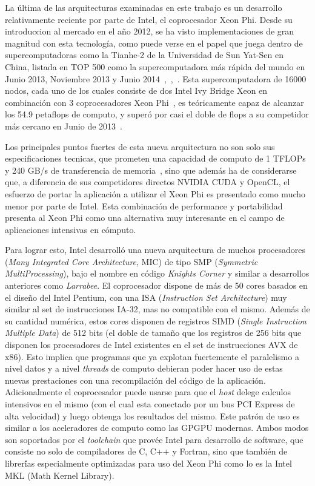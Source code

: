 La \'ultima de las arquitecturas examinadas en este trabajo es un desarrollo relativamente reciente
por parte de Intel, el coprocesador Xeon Phi. Desde su introduccion al mercado en el a\~no 2012, se ha visto implementaciones de gran magnitud con esta tecnolog\'ia, como puede verse en el papel que juega dentro de supercomputadoras como la Tianhe-2 de la Universidad de Sun Yat-Sen en China,
listada en TOP 500 como la supercomputadora más rápida del mundo en Junio 2013, Noviembre 2013 y
Junio 2014~\cite{Top500XeonPhiJune2013},~\cite{Top500XeonPhiNov2013},~\cite{Top500XeonPhiJune2014}. Esta supercomputadora de 16000 nodos, cada uno de los cuales consiste de dos Intel
Ivy Bridge Xeon en combinaci\'on con 3 coprocesadores Xeon Phi~\cite{Top500XeonPhiJune2013}, es te\'oricamente capaz de alcanzar los
54.9 petaflops de computo, y super\'o por casi el doble de flops a su competidor m\'as cercano en
Junio de 2013~\cite{Top500XeonPhiJune2013}.

Los principales puntos fuertes de esta nueva arquitectura no son solo sus especificaciones tecnicas, que prometen una
capacidad de computo de 1 TFLOPs y 240 GB/s de transferencia de memoria~\cite{}, sino que además ha de considerarse
que, a diferencia de sus competidores directos NVIDIA CUDA y OpenCL, el esfuerzo de portar la aplicación a utilizar
el Xeon Phi es presentado como mucho menor por parte de Intel. Esta combinación de performance y portabilidad
presenta al Xeon Phi como una alternativa muy interesante en el campo de aplicaciones intensivas en cómputo.

Para lograr esto, Intel desarroll\'o una nueva arquitectura de muchos procesadores (\textit{Many Integrated Core Architecture}, MIC) de
tipo SMP (\textit{Symmetric MultiProcessing}), bajo el nombre en código \textit{Knights Corner} y similar a desarrollos anteriores como \textit{Larrabee}. El coprocesador dispone de más de 50 cores basados en el dise\~no del Intel Pentium, con una ISA (\textit{Instruction Set Architecture}) muy similar al set de instrucciones IA-32, mas no compatible con el mismo. Además de su cantidad
numérica, estos cores disponen de registros SIMD (\textit{Single Instruction Multiple Data}) de 512 bits (el doble de tamaño que los registros de 256
bits que disponen los procesadores de Intel existentes en el set de instrucciones AVX de x86). Esto implica que programas
que ya explotan fuertemente el paralelismo a nivel datos y a nivel \textit{threads} de computo debieran poder hacer uso de
estas nuevas prestaciones con una recompilación del c\'odigo de la aplicaci\'on. Adicionalmente el coprocesador puede usarse para que el
\textit{host} delege calculos intensivos en el mismo (con el cual esta conectado por un bus
PCI Express de alta velocidad) y luego obtenga los resultados del mismo. Este patr\'on de uso es similar a los aceleradores de computo como las GPGPU modernas. Ambos modos son soportados por el \textit{toolchain} que prov\'ee Intel para desarrollo de software, que consiste no solo de compiladores de C, C++ y Fortran, sino que también de librer\'ías especialmente optimizadas para uso del Xeon Phi como lo es la Intel MKL (Math Kernel Library).~\cite{IntelXeonPhiWhitePaper}

